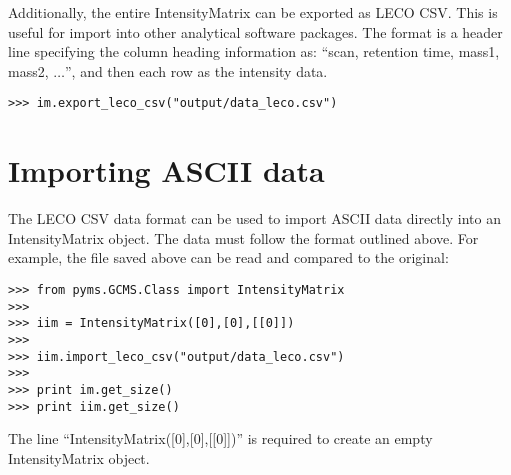 Additionally, the entire IntensityMatrix can be exported as LECO CSV. This is
 useful for import into other analytical software packages.
The format is a header line specifying the column heading information as:
``scan, retention time, mass1, mass2, $\dots$'', and then each row as the
intensity data.

\begin{verbatim}
>>> im.export_leco_csv("output/data_leco.csv")
\end{verbatim}

\section{Importing ASCII data}


The LECO CSV data format can be used to import ASCII data directly into an
IntensityMatrix object.  The data must follow the format outlined above.  For
example, the file saved above can be read and compared to the original:

\begin{verbatim}
>>> from pyms.GCMS.Class import IntensityMatrix
>>>
>>> iim = IntensityMatrix([0],[0],[[0]])
>>>
>>> iim.import_leco_csv("output/data_leco.csv")
>>>
>>> print im.get_size()
>>> print iim.get_size()
\end{verbatim}

The line ``IntensityMatrix([0],[0],[[0]])'' is required to create an empty
IntensityMatrix object.